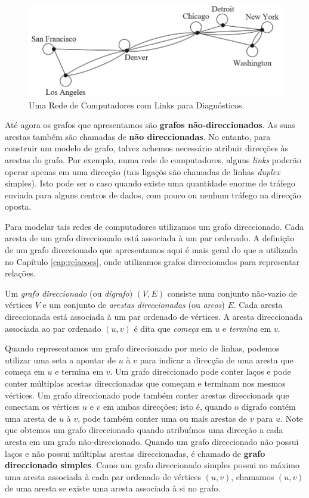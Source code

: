 \begin{figure}[H]
	\centering
	\includegraphics[scale=1]{chapter/imagens/53}
	\caption{Uma Rede de Computadores com Links para Diagnósticos.}
	\label{fig53}
\end{figure}


Até agora os grafos que apresentamos são \textbf{grafos não-direccionados}. As
suas arestas também são chamadas de \textbf{não direccionadas}. No entanto, para
construir um modelo de grafo, talvez achemos necessário atribuir direcções às
arestas do grafo. Por exemplo, numa rede de computadores, alguns \emph{links}
poderão operar apenas em uma direcção (tais ligaçõs são chamadas de linhas
\emph{duplex} simples). Isto pode ser o caso quando existe uma quantidade enorme
de tráfego enviada para alguns centros de dados, com pouco ou nenhum tráfego na
direcção oposta.

Para modelar tais redes de computadores utilizamos um grafo direccionado. Cada
aresta de um grafo direccionado está associada à um par ordenado. A definição de
um grafo direccionado que apresentamos aqui é mais geral do que a utilizada no
Capítulo \ref{cap:relacoes}, onde utilizamos grafos direccionados para
representar relações.

\begin{defn}
\label{def52}
Um \emph{grafo direccionado} (ou \emph{digrafo}) $(V,E)$ consiste num conjunto
não-vazio de vértices $V$ e um conjunto de \emph{arestas direccionadas} (ou
\emph{arcos}) $E$. Cada aresta direccionada está associada à um par ordenado de
vértices. A aresta direccionada associada ao par ordenado $(u,v)$ é dita que
\emph{começa} em $u$ e \emph{termina} em $v$.
\end{defn}

Quando representamos um grafo direccionado por meio de linhas, podemos utilizar
uma seta a apontar de $u$ à $v$ para indicar a direcção de uma aresta que começa
em $u$ e termina em $v$. Um grafo direccionado pode conter laços e pode conter
múltiplas arestas direccionadas que começam e terminam nos mesmos vértices. Um
grafo direccionado pode também conter arestas direccionads que conectam os
vértices $u$ e $v$ em ambas direcções; isto é, quando o dígrafo contém uma
aresta de $u$ à $v$, pode também conter uma ou mais arestas de $v$ para $u$.
Note que obtemos um grafo direccionado quando atribuímos uma direcção a cada
aresta em um grafo não-direccionado. Quando um grafo direccionado não possui
laços e não possui múltiplas arestas direccionadas, é chamado de \textbf{grafo
direccionado simples}. Como um grafo direccionado simples possui no máximo uma
aresta associada à cada par ordenado de vértices $(u,v)$, chamamos $(u,v)$ de
uma aresta se existe uma aresta associada à si no grafo.

